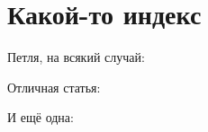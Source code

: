 
\title{}
\author{}
\date{01 May 2022}

\maketitle
\section{Какой-то индекс}
Петля, на всякий случай: 

Отличная статья: 

И ещё одна: 
